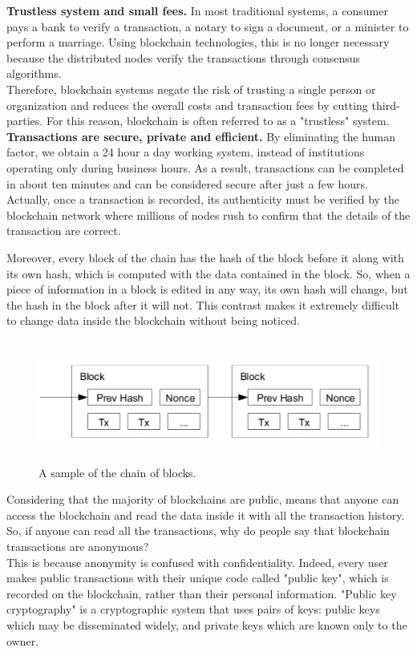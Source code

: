 \textbf{Trustless system and small fees.}
In most traditional systems, a consumer pays a bank to verify a transaction,   
a notary to sign a document, or a minister to perform a marriage. Using 
blockchain technologies, this is no longer necessary because the distributed
nodes verify the transactions through consensus algorithms.\\
Therefore, blockchain systems negate the risk of trusting a single person or 
organization and reduces the overall costs and transaction fees by cutting 
third-parties. For this reason, blockchain is often referred to as a "trustless"
system.\cite{binancevision}\cite{investopedia}\bigskip\\ 
\textbf{Transactions are secure, private and efficient.}
By eliminating the human factor, we obtain a 24 hour a day 
working system, instead of institutions operating only during business hours.
As a result, transactions can be completed in about ten minutes and can be 
considered secure after just a few hours. Actually, once a transaction is 
recorded, its authenticity must be verified by the blockchain network where 
millions of nodes rush to confirm that the details of the transaction are correct.

Moreover, every block of the chain has the hash of the block before it along with
its own hash, which is computed with the data contained in the block. So, when
a piece of information in a block is edited in any way, its own hash will change, but the
hash in the block after it will not. This contrast makes it extremely difficult to 
change data inside the blockchain without being noticed.

\begin{figure}[h]
    \centering
    \includegraphics[height=4cm]{block_hash.png}
    \caption{A sample of the chain of blocks.\cite{bitcoin}}
    \label{fig:blockhash}
\end{figure}

Considering that the majority of blockchains are public, means that anyone 
can access the blockchain and read the data inside it with all the transaction 
history. So, if anyone can read all the transactions, why do people say that
blockchain transactions are anonymous?\\
This is because anonymity is confused with confidentiality. Indeed, every user makes 
public transactions with their unique code called "public key",
which is recorded on the blockchain, rather than their personal information.\cite{investopedia}
"Public key cryptography" is a cryptographic system that uses pairs of keys: public keys which may 
be disseminated widely, and private keys which are known only to the owner.\pagebreak

